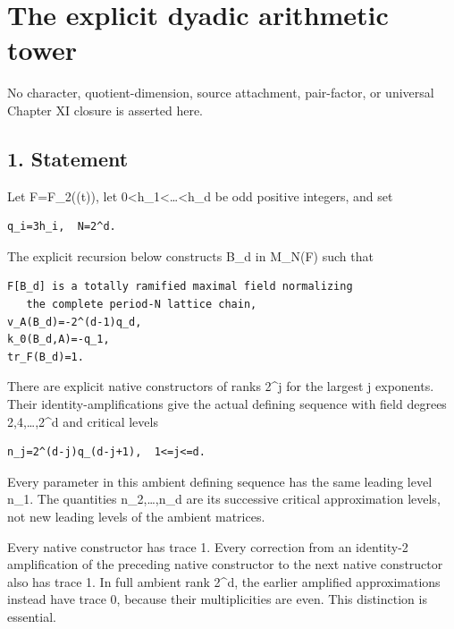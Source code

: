 \clearpage
\section{The explicit dyadic arithmetic tower}\label{app:dyadic_tower}

No character, quotient-dimension,
source attachment, pair-factor, or universal Chapter XI closure is
asserted here.

\hypertarget{dyadic_tower-statement}{%
\subsection{1. Statement}\label{dyadic_tower-statement}}

Let F=F\_2((t)), let 0\textless h\_1\textless\ldots\textless h\_d be odd
positive integers, and set

\begin{Verbatim}[fontsize=\small,breaklines=true,breakanywhere=true]
q_i=3h_i,  N=2^d.
\end{Verbatim}

The explicit recursion below constructs B\_d in M\_N(F) such that

\begin{Verbatim}[fontsize=\small,breaklines=true,breakanywhere=true]
F[B_d] is a totally ramified maximal field normalizing
   the complete period-N lattice chain,
v_A(B_d)=-2^(d-1)q_d,
k_0(B_d,A)=-q_1,
tr_F(B_d)=1.
\end{Verbatim}

There are explicit native constructors of ranks 2\^{}j for the largest j
exponents. Their identity-amplifications give the actual defining
sequence with field degrees 2,4,\ldots,2\^{}d and critical levels

\begin{Verbatim}[fontsize=\small,breaklines=true,breakanywhere=true]
n_j=2^(d-j)q_(d-j+1),  1<=j<=d.
\end{Verbatim}

Every parameter in this ambient defining sequence has the same leading
level n\_1. The quantities n\_2,\ldots,n\_d are its successive critical
approximation levels, not new leading levels of the ambient matrices.

Every native constructor has trace 1. Every correction from an
identity-2 amplification of the preceding native constructor to the next
native constructor also has trace 1. In full ambient rank 2\^{}d, the
earlier amplified approximations instead have trace 0, because their
multiplicities are even. This distinction is essential.

